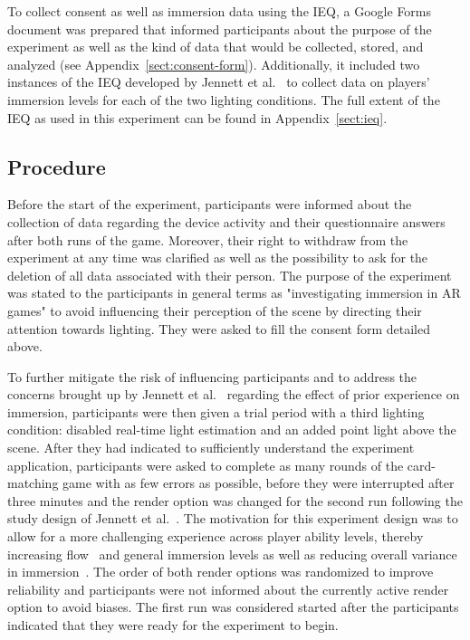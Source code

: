\documentclass[12pt,twoside,english]{article}
\begin{document}
To collect consent as well as immersion data using the \gls{IEQ}, a Google Forms document was prepared that informed participants about the purpose of the experiment as well as the kind of data that would be collected, stored, and analyzed (see Appendix~\ref{sect:consent-form}).
Additionally, it included two instances of the \gls{IEQ} developed by Jennett et al.~\cite{jennett_measuring_2008} to collect data on players' immersion levels for each of the two lighting conditions.
The full extent of the \gls{IEQ} as used in this experiment can be found in Appendix~\ref{sect:ieq}.

\subsection{Procedure}
\label{sect:procedure}

Before the start of the experiment, participants were informed about the collection of data regarding the device activity and their questionnaire answers after both runs of the game.
Moreover, their right to withdraw from the experiment at any time was clarified as well as the possibility to ask for the deletion of all data associated with their person.
The purpose of the experiment was stated to the participants in general terms as "investigating immersion in \gls{AR} games" to avoid influencing their perception of the scene by directing their attention towards lighting. 
They were asked to fill the consent form detailed above.

To further mitigate the risk of influencing participants and to address the concerns brought up by Jennett et al.~\cite{jennett_measuring_2008} regarding the effect of prior experience on immersion, participants were then given a trial period with a third lighting condition: disabled real-time light estimation and an added point light above the scene.
After they had indicated to sufficiently understand the experiment application, participants were asked to complete as many rounds of the card-matching game with as few errors as possible, before they were interrupted after three minutes and the render option was changed for the second run following the study design of Jennett et al.~\cite{jennett_measuring_2008}.
The motivation for this experiment design was to allow for a more challenging experience across player ability levels, thereby increasing flow~\cite{csikszentmihalyi_flow_1990} and general immersion levels as well as reducing overall variance in immersion~\cite{jennett_measuring_2008}.
The order of both render options was randomized to improve reliability and participants were not informed about the currently active render option to avoid biases.
The first run was considered started after the participants indicated that they were ready for the experiment to begin.
\end{document}
